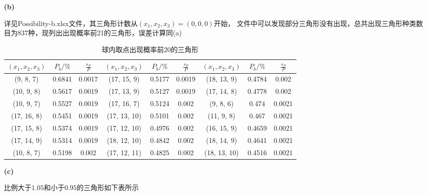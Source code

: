 \documentclass[UTF8]{ctexart}
\begin{document}
\noindent\textbf{(b)}

详见Possibility-b.xlsx文件，其三角形计数从$(x_1,x_2,x_3)=(0,0,0)$开始，
文件中可以发现部分三角形没有出现，总共出现三角形种类数目为837种，现列出出现概率前21的三角形，误差计算同(a)

\begin{table}[H]
    \centering
    \caption{球内取点出现概率前20的三角形}
    \begin{tabular}{|ccc|ccc|ccc|}
        \hline
        $(x_1,x_2,x_3)$ & $P_b/\%$ & $\frac{s_P}{P}$ & $(x_1,x_2,x_3)$ & $P_b/\%$ & $\frac{s_P}{P}$ & $(x_1,x_2,x_3)$ & $P_b/\%$ & $\frac{s_P}{P}$\\
        \hline
        (9, 8, 7)&0.6841&0.0017&(17, 15, 9)&0.5177&0.0019&(18, 13, 9)&0.4784&0.002\\
(10, 9, 8)&0.5617&0.0019&(17, 13, 9)&0.5127&0.0019&(17, 14, 8)&0.4778&0.002\\
(10, 9, 7)&0.5527&0.0019&(17, 16, 7)&0.5124&0.002&(9, 8, 6)&0.474&0.0021\\
(17, 16, 8)&0.5451&0.0019&(17, 13, 10)&0.5101&0.002&(11, 9, 8)&0.467&0.0021\\
(17, 15, 8)&0.5374&0.0019&(17, 12, 10)&0.4976&0.002&(16, 15, 9)&0.4659&0.0021\\
(17, 14, 9)&0.5314&0.0019&(18, 12, 10)&0.4842&0.002&(18, 14, 9)&0.4641&0.0021\\
(10, 8, 7)&0.5198&0.002&(17, 12, 11)&0.4825&0.002&(18, 13, 10)&0.4516&0.0021\\
        \hline
    \end{tabular}
\end{table}

\noindent\textbf{(c)}

比例大于$1.05$和小于$0.95$的三角形如下表所示
\end{document}
